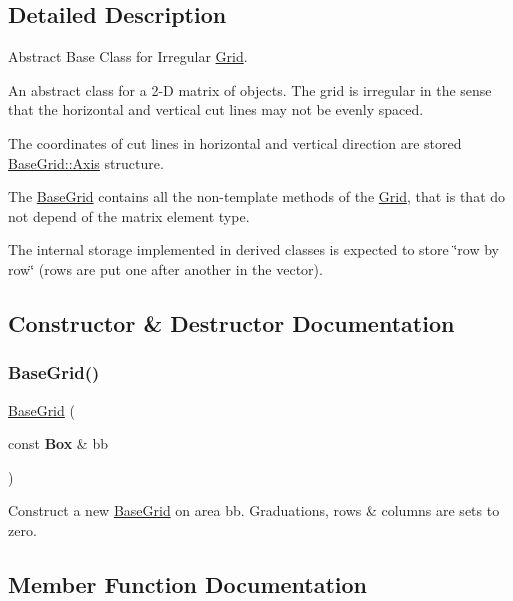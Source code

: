 \subsection{Detailed Description}
Abstract Base Class for Irregular \mbox{\hyperlink{classKatabatic_1_1Grid}{Grid}}. 

An abstract class for a 2-\/D matrix of objects. The grid is irregular in the sense that the horizontal and vertical cut lines may not be evenly spaced.

The coordinates of cut lines in horizontal and vertical direction are stored \mbox{\hyperlink{classKatabatic_1_1BaseGrid_1_1Axis}{Base\+Grid\+::\+Axis}} structure.

The \mbox{\hyperlink{classKatabatic_1_1BaseGrid}{Base\+Grid}} contains all the non-\/template methods of the \mbox{\hyperlink{classKatabatic_1_1Grid}{Grid}}, that is that do not depend of the matrix element type.

The internal storage implemented in derived classes is expected to store \char`\"{}row by row\char`\"{} (rows are put one after another in the vector). 

\subsection{Constructor \& Destructor Documentation}
\mbox{\label{classKatabatic_1_1BaseGrid_ac479157e8ac115074615167e8a4a2789}} 
\subsubsection{\texorpdfstring{Base\+Grid()}{BaseGrid()}}
{\footnotesize\ttfamily \mbox{\hyperlink{classKatabatic_1_1BaseGrid}{Base\+Grid}} (\begin{DoxyParamCaption}\item[{const \textbf{ Box} \&}]{bb }\end{DoxyParamCaption})\hspace{0.3cm}{\ttfamily [protected]}}

Construct a new \mbox{\hyperlink{classKatabatic_1_1BaseGrid}{Base\+Grid}} on area {\ttfamily bb}. Graduations, rows \& columns are sets to zero. 

\subsection{Member Function Documentation}
\mbox{\label{classKatabatic_1_1BaseGrid_a3a80b6032f86a56bec74609034b3246f}} 
